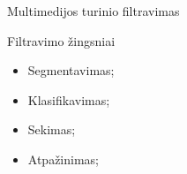 Multimedijos turinio filtravimas

Filtravimo žingsniai

\begin{itemize}
    \item Segmentavimas;
    \item Klasifikavimas;
    \item Sekimas;
    \item Atpažinimas;
\end{itemize}

